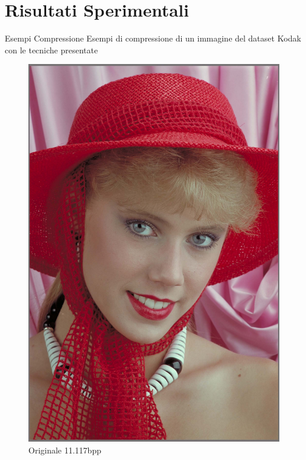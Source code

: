 \section{Risultati Sperimentali}

    \begin{frame}{Esempi Compressione}
        Esempi di compressione di un immagine del dataset Kodak \cite{KodakDataset} con le tecniche presentate\\
        \begin{figure}[!ht]
            \begin{minipage}[]{0.13\linewidth}
                \centering
                \includegraphics[width=\textwidth]{Immagini/IMAGES/PNG_IMG0004.pdf}
                \caption{Originale 11.117bpp}
                \label{fig:Originnal}
            \end{minipage}

\end{figure}
\end{frame}
